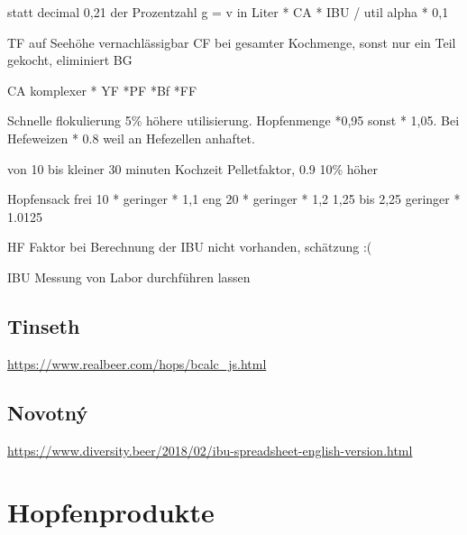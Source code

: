 \documentclass[a4paper,parskip=half]{scrartcl}
\begin{document}
statt decimal 0,21 der Prozentzahl 
g = v in Liter * CA * IBU / util  alpha * 0,1

TF auf Seehöhe vernachlässigbar
CF bei gesamter Kochmenge, sonst nur ein Teil gekocht, eliminiert BG

CA komplexer * YF *PF *Bf *FF

\parencite[140\psq]{Garetz1994} 
Schnelle flokulierung 5\% höhere utilisierung. Hopfenmenge *0,95
sonst * 1,05. Bei Hefeweizen * 0.8 weil an Hefezellen anhaftet.

von 10 bis kleiner 30 minuten Kochzeit Pelletfaktor, 0.9 10\% höher

Hopfensack
frei 10 * geringer * 1,1
eng 20 * geringer * 1,2
1,25 bis 2,25 geringer * 1.0125

HF Faktor bei Berechnung der IBU nicht vorhanden, schätzung :(

\parencite[134-144]{Garetz1994} 

IBU Messung von Labor durchführen lassen
\parencite[145]{Garetz1994} 




\subsection*{Tinseth}

\url{https://www.realbeer.com/hops/bcalc_js.html}

\subsection*{Novotný}

\url{https://www.diversity.beer/2018/02/ibu-spreadsheet-english-version.html}

\section*{Hopfenprodukte}


\parencite{Annemueller2015}
\parencite{Beechum2017}
\parencite{Janish2019}
\parencite{Hieronymus2012}
\parencite{Nottebohm2020}
\parencite{Hall1997}
\parencite{Rager1990}
\parencite{Daniels1996}
\parencite{Mosher1994}
\parencite{Holle2010}
\parencite{Tinseth1995}
\parencite{Jones1995}
\parencite{Novotny2016}
\parencite{Brueckelmeier2018}

\printbibliography[title=Quellen]
\end{document}
